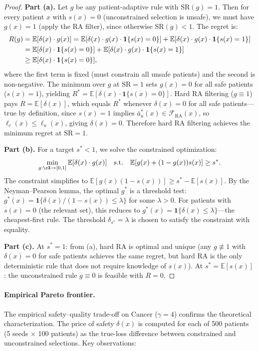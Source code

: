 \documentclass{article}
\newcommand{\E}{\mathbb{E}}
\newcommand{\ba}{\bar{a}}
\newcommand{\cF}{\mathcal{F}}
\newcommand{\ind}{\mathbf{1}}
\begin{document}
\begin{proof}
\textbf{Part (a).} Let $g$ be any patient-adaptive rule with $\mathrm{SR}(g) = 1$. Then for every patient $x$ with $s(x) = 0$ (unconstrained selection is unsafe), we must have $g(x) = 1$ (apply the RA filter), since otherwise $\mathrm{SR}(g) < 1$. The regret is:
\begin{align}
R(g) &= \E[\delta(x) \cdot g(x)] = \E[\delta(x) \cdot g(x) \cdot \ind\{s(x) = 0\}] + \E[\delta(x) \cdot g(x) \cdot \ind\{s(x) = 1\}] \notag \\
&= \E[\delta(x) \cdot \ind\{s(x) = 0\}] + \E[\delta(x) \cdot g(x) \cdot \ind\{s(x) = 1\}] \notag \\
&\geq \E[\delta(x) \cdot \ind\{s(x) = 0\}], \label{eq:pareto_lb}
\end{align}
where the first term is fixed (must constrain all unsafe patients) and the second is non-negative. The minimum over $g$ at $\mathrm{SR} = 1$ sets $g(x) = 0$ for all safe patients ($s(x) = 1$), yielding $R^* = \E[\delta(x) \cdot \ind\{s(x) = 0\}]$. Hard RA filtering ($g \equiv 1$) pays $R = \E[\delta(x)]$, which equals $R^*$ whenever $\delta(x) = 0$ for all safe patients---true by definition, since $s(x) = 1$ implies $\ba^*_u(x) \in \cF_{\mathrm{RA}}(x)$, so $\ell_c(x) \leq \ell_u(x)$, giving $\delta(x) = 0$. Therefore hard RA filtering achieves the minimum regret at $\mathrm{SR} = 1$.

\textbf{Part (b).} For a target $s^* < 1$, we solve the constrained optimization:
\[
\min_{g: \cX \to [0,1]} \E[\delta(x) \cdot g(x)] \quad \text{s.t.} \quad \E[g(x) + (1-g(x)) s(x)] \geq s^*.
\]
The constraint simplifies to $\E[g(x) (1 - s(x))] \geq s^* - \E[s(x)]$. By the Neyman--Pearson lemma, the optimal $g^*$ is a threshold test: $g^*(x) = \ind\{\delta(x) / (1 - s(x)) \leq \lambda\}$ for some $\lambda > 0$. For patients with $s(x) = 0$ (the relevant set), this reduces to $g^*(x) = \ind\{\delta(x) \leq \lambda\}$---the cheapest-first rule. The threshold $\delta_{s^*} = \lambda$ is chosen to satisfy the constraint with equality.

\textbf{Part (c).} At $s^* = 1$: from (a), hard RA is optimal and unique (any $g \not\equiv 1$ with $\delta(x) = 0$ for safe patients achieves the same regret, but hard RA is the only deterministic rule that does not require knowledge of $s(x)$). At $s^* = \E[s(x)]$: the unconstrained rule $g \equiv 0$ is feasible with $R = 0$.
\end{proof}

\paragraph{Empirical Pareto frontier.}
\label{fig:pareto_frontier}
The empirical safety--quality trade-off on Cancer ($\gamma = 4$) confirms the theoretical characterization. The price of safety $\delta(x)$ is computed for each of 500 patients (5 seeds $\times$ 100 patients) as the true-loss difference between constrained and unconstrained selections. Key observations:
\end{document}
